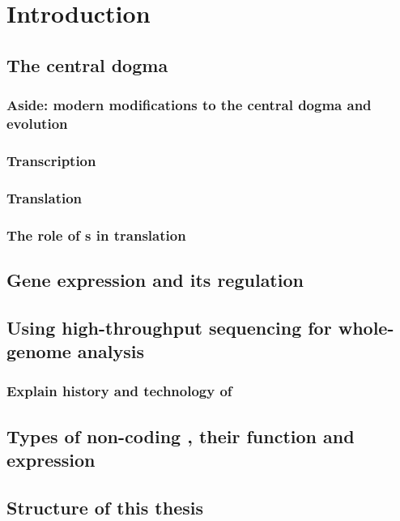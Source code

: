 \chapter{Introduction}

\section{The central dogma}

\begin{figure}[h!]
    \centering
\end{figure}

\subsection{Aside: modern modifications to the central dogma and evolution}

\subsection{Transcription}

\subsection{Translation}

\subsection{The role of s in translation}

\section{Gene expression and its regulation}

\section{Using high-throughput sequencing for whole-genome analysis}

\subsection{Explain history and technology of }

\section{Types of non-coding , their function and expression}

\section{Structure of this thesis}
